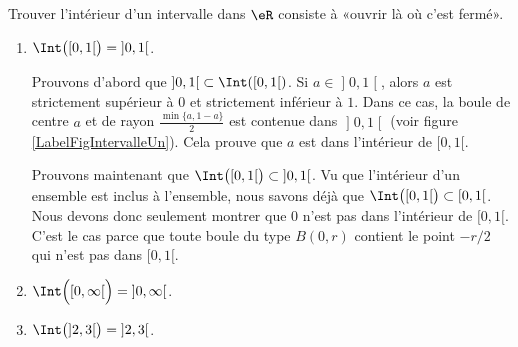\begin{example}
	Trouver l'intérieur d'un intervalle dans $\eR$ consiste à «ouvrir là où c'est fermé». 
	\begin{enumerate}

		\item
			$\Int\big(\mathopen[ 0 , 1 [\big)=\mathopen] 0 , 1 \mathclose[$. 
			
			Prouvons d'abord que $\mathopen] 0,1  \mathclose[\subset\Int(\mathopen[ 0 , 1 [)$. Si $a\in\mathopen] 0 , 1 \mathclose[$, alors $a$ est strictement supérieur à $0$ et strictement inférieur à $1$. Dans ce cas, la boule de centre $a$ et de rayon $\frac{ \min\{ a,1-a \} }{ 2 }$ est contenue dans $\mathopen] 0 , 1 \mathclose[$ (voir figure \ref{LabelFigIntervalleUn}). Cela prouve que $a$ est dans l'intérieur de $\mathopen[ 0 , 1 [$.

\newcommand{\CaptionFigIntervalleUn}{Trouver le rayon d'une boule autour de $a$. Une boule qui serait centrée en $a$ avec un rayon strictement plus petit à la fois de $a$ et de $1-a$ est entièrement contenue dans le segment $\mathopen] 0 , 1 \mathclose[$.}


			Prouvons maintenant que $\Int\big( \mathopen[ 0 , 1 [ \big)\subset\mathopen] 0 , 1 \mathclose[$. Vu que l'intérieur d'un ensemble est inclus à l'ensemble, nous savons déjà que $\Int\big( \mathopen[ 0 , 1 [ \big)\subset\mathopen[ 0 , 1 [$. Nous devons donc seulement montrer que $0$ n'est pas dans l'intérieur de $\mathopen[ 0 , 1 [$. C'est le cas parce que toute boule du type $B(0,r)$ contient le point $-r/2$ qui n'est pas dans $\mathopen[ 0 , 1 [$.

		\item
			$\Int\Big( \mathopen[ 0 , \infty [ \Big)=\mathopen] 0 , \infty \mathclose[$.
		\item
			$\Int\big( \mathopen] 2 , 3 \mathclose[ \big)=\mathopen] 2 , 3 \mathclose[$.

	\end{enumerate}
	
\end{example}

